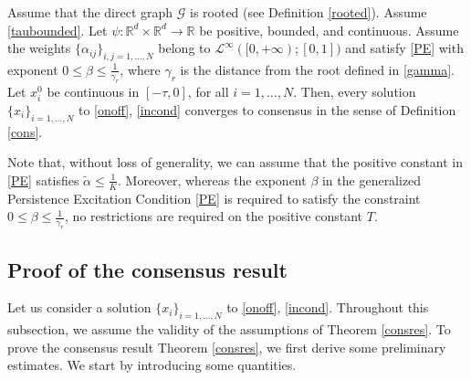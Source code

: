 \documentclass[11pt]{article}
\begin{document}
\begin{thm}\label{consres}
	Assume that the direct graph $\mathcal{G}$ is rooted (see Definition \ref{rooted}). Assume \eqref{taubounded}. Let $\psi:\mathbb{R}^d\times\mathbb{R}^d\rightarrow\mathbb{R}$ be positive, bounded, and continuous. Assume the weights $\{\alpha_{ij}\}_{i,j=1,\dots,N}$ belong to $\mathcal{L}^\infty([0,+\infty);[0,1])$ and satisfy \eqref{PE} with exponent $0\leq \beta\leq \frac{1}{\gamma_{r}}$, where $\gamma_{r}$ is the distance from the root defined in \eqref{gamma}. Let $x_i^0$ be continuous in $[-\tau,0]$, for all $i=1,\dots,N$. Then, every solution $\{x_i\}_{i=1,\dots,N}$ to \eqref{onoff}, \eqref{incond} converges to consensus in the sense of Definition \ref{cons}.
\end{thm}	
\begin{oss}
	Note that, without loss of generality, we can assume that the positive constant in \eqref{PE} satisfies $\tilde{\alpha}\leq \frac{1}{K}$. Moreover, whereas the exponent $\beta$ in the generalized Persistence Excitation Condition \eqref{PE} is required to satisfy the constraint $0\leq \beta \leq \frac{1}{\gamma_{r}}$, no restrictions are required on the positive constant $T$. 
\end{oss}
	\subsection{Proof of the consensus result}
	 Let us consider a solution $\{x_{i}\}_{i=1,\dots,N}$ to \eqref{onoff}, \eqref{incond}. Throughout this subsection, we assume the validity of the assumptions of Theorem \ref{consres}. To prove the consensus result Theorem \ref{consres}, we first derive some preliminary estimates. We start by introducing some quantities.
    
\end{document}
